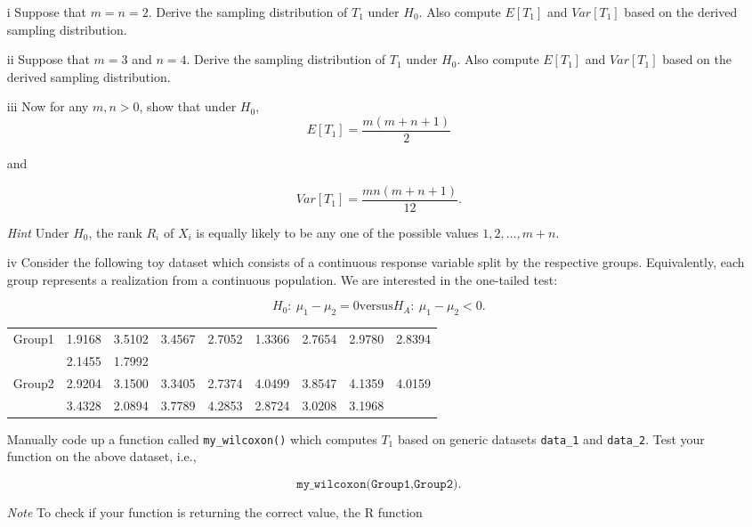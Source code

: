 \documentclass[letterpaper]{article}
\begin{document}
	\begin{enumerate}
		\item[i] Suppose that $m=n=2$. Derive the sampling distribution of $T_1$ under $H_0$. Also compute $E[T_1]$ and $Var[T_1]$ based on the derived sampling distribution.
		
		\item[ii] Suppose that $m=3$ and $n=4$. Derive the sampling distribution of $T_1$ under $H_0$. Also compute $E[T_1]$ and $Var[T_1]$ based on the derived sampling distribution.
		
		\item[iii] Now for any $m,n>0$, show that under $H_0$,
		\[
		E[T_1]=\frac{m(m+n+1)}{2}
		\]
		
		and
		
		\[
		Var[T_1]=\frac{mn(m+n+1)}{12}.
		\]
		
		\emph{Hint} Under $H_0$, the rank $R_i$ of $X_i$ is equally likely to be any one of the possible values $1,2,\dots,m+n$.
		
		\item[iv] Consider the following toy dataset which consists of a continuous response variable split by the respective groups. Equivalently, each group represents a realization from a continuous population. We are interested in the one-tailed test:
		
		\[
		H_0:\ \mu_1-\mu_2=0
		\text{versus} 
		H_A:\ \mu_1-\mu_2<0.
		\]
		
		\begin{center}
			\begin{tabular}{lcccccccc}
				Group1 & 1.9168 & 3.5102 & 3.4567 & 2.7052 & 1.3366 & 2.7654 & 2.9780 & 2.8394 \\
				& 2.1455 & 1.7992 \\
				\hline
				Group2 & 2.9204 & 3.1500 & 3.3405 & 2.7374 & 4.0499 & 3.8547 & 4.1359 & 4.0159 \\
				& 3.4328 & 2.0894 & 3.7789 & 4.2853 & 2.8724 & 3.0208 & 3.1968
			\end{tabular}
		\end{center}
		
		Manually code up a function called \texttt{my\_wilcoxon()} which computes $T_1$ based on generic datasets \texttt{data\_1} and \texttt{data\_2}. Test your function on the above dataset, i.e.,
		
		\[
		\texttt{my\_wilcoxon(Group1,Group2)}.
		\]
		
		\emph{Note} To check if your function is returning the correct value, the R function
		

\end{enumerate}
\end{document}
